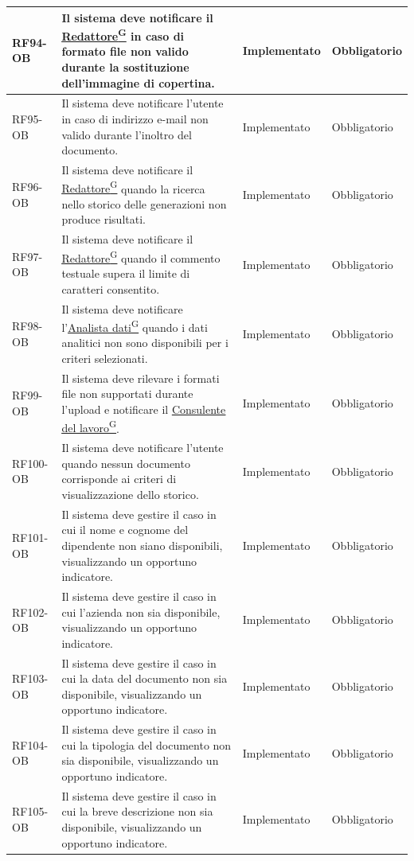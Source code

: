 \documentclass[a4paper,12pt]{article}
\providecommand{\glslink}[2]{\href{https://alittlebyte-19.github.io/Documentazione/glossario.html\#gls-#1}{\underline{#2}\textsuperscript{\scriptsize G}}}
\begin{document}
\begin{sloppypar}
{\begin{longtable}{|p{1.8cm}|p{8.7cm}|p{2.4cm}|p{2.1cm}|}
    \hline
    RF94-OB & Il sistema deve notificare il \glslink{redattore}{Redattore} in caso di formato file non valido durante la sostituzione dell'immagine di copertina. & Implementato & Obbligatorio \\
    \hline
    RF95-OB & Il sistema deve notificare l'utente in caso di indirizzo e-mail non valido durante l'inoltro del documento. & Implementato & Obbligatorio \\
    \hline
    RF96-OB & Il sistema deve notificare il \glslink{redattore}{Redattore} quando la ricerca nello storico delle generazioni non produce risultati. & Implementato & Obbligatorio \\
    \hline
    RF97-OB & Il sistema deve notificare il \glslink{redattore}{Redattore} quando il commento testuale supera il limite di caratteri consentito. & Implementato & Obbligatorio \\
    \hline
    RF98-OB & Il sistema deve notificare l'\glslink{analista-dati}{Analista dati} quando i dati analitici non sono disponibili per i criteri selezionati. & Implementato & Obbligatorio \\
    \hline
    RF99-OB & Il sistema deve rilevare i formati file non supportati durante l'upload e notificare il \glslink{consulente-del-lavoro-cdl}{Consulente del lavoro}. & Implementato & Obbligatorio \\
    \hline
    RF100-OB & Il sistema deve notificare l'utente quando nessun documento corrisponde ai criteri di visualizzazione dello storico. & Implementato & Obbligatorio \\
    \hline
    RF101-OB & Il sistema deve gestire il caso in cui il nome e cognome del dipendente non siano disponibili, visualizzando un opportuno indicatore. & Implementato & Obbligatorio \\
    \hline
    RF102-OB & Il sistema deve gestire il caso in cui l'azienda non sia disponibile, visualizzando un opportuno indicatore. & Implementato & Obbligatorio \\
    \hline
    RF103-OB & Il sistema deve gestire il caso in cui la data del documento non sia disponibile, visualizzando un opportuno indicatore. & Implementato & Obbligatorio \\
    \hline
    RF104-OB & Il sistema deve gestire il caso in cui la tipologia del documento non sia disponibile, visualizzando un opportuno indicatore. & Implementato & Obbligatorio \\
    \hline
    RF105-OB & Il sistema deve gestire il caso in cui la breve descrizione non sia disponibile, visualizzando un opportuno indicatore. & Implementato & Obbligatorio \\

\end{longtable}}
\end{sloppypar}
\end{document}
